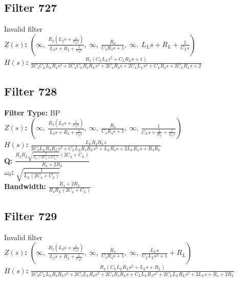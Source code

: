 \documentclass{article}
\begin{document}
\subsection*{Filter 727}
Invalid filter \\ 
\textbf{$Z(s)$:} $\left( \infty, \  \frac{R_{2} \left(L_{2} s + \frac{1}{C_{2} s}\right)}{L_{2} s + R_{2} + \frac{1}{C_{2} s}}, \  \infty, \  \frac{R_{4}}{C_{4} R_{4} s + 1}, \  \infty, \  L_{L} s + R_{L} + \frac{1}{C_{L} s}\right)$ \\ 
\textbf{$H(s)$:} $\frac{R_{4} \left(C_{L} L_{L} s^{2} + C_{L} R_{L} s + 1\right)}{2 C_{4} C_{L} L_{L} R_{4} s^{3} + 2 C_{4} C_{L} R_{4} R_{L} s^{2} + 2 C_{4} R_{4} s + 2 C_{L} L_{L} s^{2} + C_{L} R_{4} s + 2 C_{L} R_{L} s + 2}$ \\ 
\subsection*{Filter 728}
\textbf{Filter Type:} BP \\ 
\textbf{$Z(s)$:} $\left( \infty, \  \frac{R_{2} \left(L_{2} s + \frac{1}{C_{2} s}\right)}{L_{2} s + R_{2} + \frac{1}{C_{2} s}}, \  \infty, \  \frac{R_{4}}{C_{4} R_{4} s + 1}, \  \infty, \  \frac{1}{C_{L} s + \frac{1}{R_{L}} + \frac{1}{L_{L} s}}\right)$ \\ 
\textbf{$H(s)$:} $\frac{L_{L} R_{4} R_{L} s}{2 C_{4} L_{L} R_{4} R_{L} s^{2} + C_{L} L_{L} R_{4} R_{L} s^{2} + L_{L} R_{4} s + 2 L_{L} R_{L} s + R_{4} R_{L}}$ \\ 
\textbf{Q:} $\frac{R_{4} R_{L} \sqrt{\frac{1}{L_{L} \left(2 C_{4} + C_{L}\right)}} \left(2 C_{4} + C_{L}\right)}{R_{4} + 2 R_{L}}$ \\ 
\textbf{$\omega_0$:} $\sqrt{\frac{1}{L_{L} \left(2 C_{4} + C_{L}\right)}}$ \\ 
\textbf{Bandwidth:} $\frac{R_{4} + 2 R_{L}}{R_{4} R_{L} \left(2 C_{4} + C_{L}\right)}$ \\ 
\subsection*{Filter 729}
Invalid filter \\ 
\textbf{$Z(s)$:} $\left( \infty, \  \frac{R_{2} \left(L_{2} s + \frac{1}{C_{2} s}\right)}{L_{2} s + R_{2} + \frac{1}{C_{2} s}}, \  \infty, \  \frac{R_{4}}{C_{4} R_{4} s + 1}, \  \infty, \  \frac{L_{L} s}{C_{L} L_{L} s^{2} + 1} + R_{L}\right)$ \\ 
\textbf{$H(s)$:} $\frac{R_{4} \left(C_{L} L_{L} R_{L} s^{2} + L_{L} s + R_{L}\right)}{2 C_{4} C_{L} L_{L} R_{4} R_{L} s^{3} + 2 C_{4} L_{L} R_{4} s^{2} + 2 C_{4} R_{4} R_{L} s + C_{L} L_{L} R_{4} s^{2} + 2 C_{L} L_{L} R_{L} s^{2} + 2 L_{L} s + R_{4} + 2 R_{L}}$ \\ 
\end{document}
